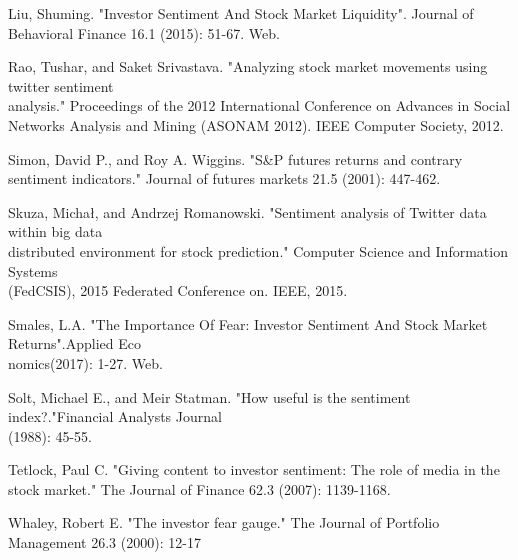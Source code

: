 Liu, Shuming. "Investor Sentiment And Stock Market Liquidity". Journal of Behavioral Finance 16.1 \hspace*{8ex}(2015): 51-67. Web.

Rao, Tushar, and Saket Srivastava. "Analyzing stock market movements using twitter sentiment \\\hspace*{8ex}analysis." Proceedings of the 2012 International Conference on Advances in Social Networks \hspace*{8ex}Analysis and Mining (ASONAM 2012). IEEE Computer Society, 2012.

Simon, David P., and Roy A. Wiggins. "S\&P futures returns and contrary sentiment indicators." Journal \hspace*{8ex}of futures markets 21.5 (2001): 447-462.

Skuza, Michał, and Andrzej Romanowski. "Sentiment analysis of Twitter data within big data \\\hspace*{8ex}distributed environment for stock prediction." Computer Science and Information Systems \\\hspace*{8ex}(FedCSIS), 2015 Federated Conference on. IEEE, 2015.

Smales, L.A. "The Importance Of Fear: Investor Sentiment And Stock Market Returns".Applied Eco\\\hspace*{8ex}nomics(2017): 1-27. Web.

Solt, Michael E., and Meir Statman. "How useful is the sentiment index?."Financial Analysts Journal\\\hspace*{8ex}(1988): 45-55.

Tetlock, Paul C. "Giving content to investor sentiment: The role of media in the stock market." The \hspace*{8ex}Journal of Finance 62.3 (2007): 1139-1168.

Whaley, Robert E. "The investor fear gauge." The Journal of Portfolio Management 26.3 (2000): 12-17
